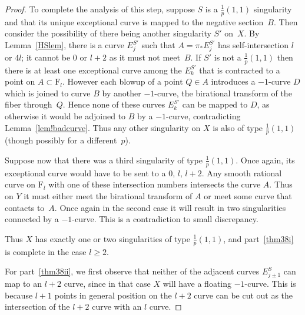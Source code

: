 \documentclass[11pt]{amsbook}
\theoremstyle{plain}
\newcommand{\ldp}{log del Pezzo}
\newcommand{\mb}[1]{\mathbb{#1}}
\newcommand{\F}{\mathrm{F}}
\begin{document}
\begin{proof}
To complete the analysis of this step, suppose $S$ is a $\frac{1}{p}(1,1)$ singularity and that its unique exceptional curve is mapped to the negative section~$B$. Then consider the possibility of there being another singularity $S'$ on~$X$. By Lemma~\ref{HSlem}, there is a curve $E_j^{S'}$ such that $A=\pi_* E_j^{S'}$ has self-intersection $l$ or $4l$; it cannot be $0$ or $l+2$ as it must not meet~$B$. If $S'$ is not a $\frac{1}{p}(1,1)$ then there is at least one exceptional curve among the $E_k^{S'}$ that is contracted to a point on $A\subset\F_l$. However each blowup of a point $Q\in A$ introduces a $-1$-curve $D$ which is joined to curve $B$ by another $-1$-curve, the birational transform of the fiber through~$Q$. Hence none of these curves $E_k^{S'}$ can be mapped to $D$, as otherwise it would be adjoined to $B$ by a $-1$-curve, contradicting Lemma~\ref{lem!badcurve}.
Thus any other singularity on $X$ is also of type $\frac{1}{p}(1,1)$ (though possibly for a different~$p$).

Suppose now that there was a third singularity of type $\frac{1}{p}(1,1)$. Once again, its exceptional curve would have to be sent to a $0, \, l, \, l+2$. Any smooth rational curve on $\F_l$ with one of these intersection numbers intersects the curve $A$. Thus on $Y$ it must either meet the birational transform of $A$ or meet some curve that contacts to~$A$. Once again in the second case it will result in two singularities connected by a $-1$-curve. This is a contradiction to small discrepancy.

Thus $X$ has exactly one or two singularities of type $\frac{1}p(1,1)$,
and part~\eqref{thm38i} is complete in the case $l\ge2$.






For part~\eqref{thm38ii}, we first observe that neither of the adjacent curves $E_{j\pm1}^S$ can
map to an $l+2$ curve, since in that case $X$ will have a floating $-1$-curve. This is because $l+1$ points in general position on the $l+2$ curve can be cut out as the intersection of the $l+2$ curve with an $l$ curve.


\end{proof}
\end{document}
